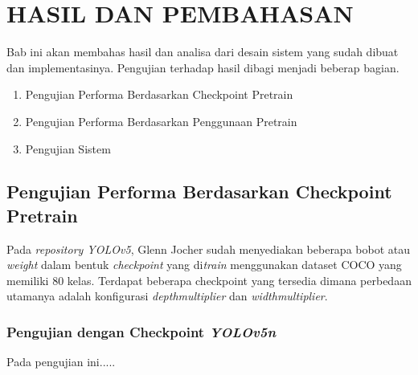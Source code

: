 \chapter{HASIL DAN PEMBAHASAN}
\label{chap:hasilpembahasan}


Bab ini akan membahas hasil dan analisa dari desain sistem yang sudah dibuat dan implementasinya. Pengujian terhadap hasil dibagi menjadi beberap bagian.

\begin{enumerate}[nolistsep]
  \item Pengujian Performa Berdasarkan Checkpoint Pretrain
  \item Pengujian Performa Berdasarkan Penggunaan Pretrain
  \item Pengujian Sistem
\end{enumerate}


\section{Pengujian Performa Berdasarkan Checkpoint Pretrain}
\label{sec:pengujianantarpretrain}

Pada \emph{repository YOLOv5}, Glenn Jocher sudah menyediakan beberapa bobot atau \emph{weight} dalam bentuk \emph{checkpoint} yang di\emph{train} menggunakan dataset COCO yang memiliki 80 kelas. Terdapat beberapa checkpoint yang tersedia dimana perbedaan utamanya adalah konfigurasi \emph{depth\textunderscore multiplier} dan \emph{width\textunderscore multiplier}. 

\subsection{Pengujian dengan Checkpoint \emph{YOLOv5n}}
\label{subsec:ujiyolo5n}

Pada pengujian ini.....

